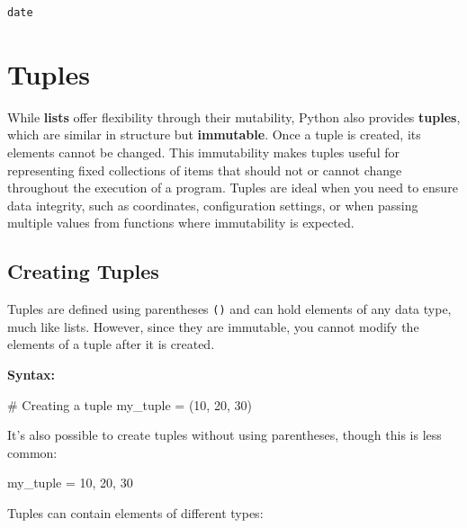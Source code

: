 \documentclass[
  letterpaper,
  DIV=11,
  numbers=noendperiod]{scrreprt}
\newenvironment{Shaded}{\begin{snugshade}}{\end{snugshade}}
\newcommand{\CommentTok}[1]{\textcolor[rgb]{0.37,0.37,0.37}{#1}}
\newcommand{\DecValTok}[1]{\textcolor[rgb]{0.68,0.00,0.00}{#1}}
\newcommand{\NormalTok}[1]{\textcolor[rgb]{0.00,0.23,0.31}{#1}}
\newcommand{\OperatorTok}[1]{\textcolor[rgb]{0.37,0.37,0.37}{#1}}
\begin{document}
\begin{verbatim}
date
\end{verbatim}

\hypertarget{tuples}{%
\section{Tuples}\label{tuples}}

While \textbf{lists} offer flexibility through their mutability, Python
also provides \textbf{tuples}, which are similar in structure but
\textbf{immutable}. Once a tuple is created, its elements cannot be
changed. This immutability makes tuples useful for representing fixed
collections of items that should not or cannot change throughout the
execution of a program. Tuples are ideal when you need to ensure data
integrity, such as coordinates, configuration settings, or when passing
multiple values from functions where immutability is expected.

\hypertarget{creating-tuples}{%
\subsection{Creating Tuples}\label{creating-tuples}}

Tuples are defined using parentheses \texttt{()} and can hold elements
of any data type, much like lists. However, since they are immutable,
you cannot modify the elements of a tuple after it is created.

\textbf{Syntax:}

\begin{Shaded}
\begin{Highlighting}[]
\CommentTok{\# Creating a tuple}
\NormalTok{my\_tuple }\OperatorTok{=}\NormalTok{ (}\DecValTok{10}\NormalTok{, }\DecValTok{20}\NormalTok{, }\DecValTok{30}\NormalTok{)}
\end{Highlighting}
\end{Shaded}

It's also possible to create tuples without using parentheses, though
this is less common:

\begin{Shaded}
\begin{Highlighting}[]
\NormalTok{my\_tuple }\OperatorTok{=} \DecValTok{10}\NormalTok{, }\DecValTok{20}\NormalTok{, }\DecValTok{30}
\end{Highlighting}
\end{Shaded}

Tuples can contain elements of different types:
\end{document}
